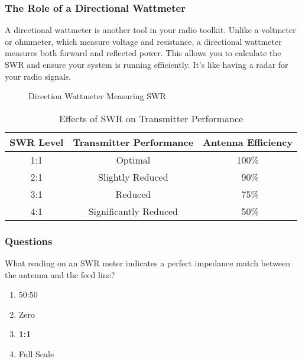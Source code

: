 \subsubsection*{The Role of a Directional Wattmeter}
A directional wattmeter is another tool in your radio toolkit. Unlike a voltmeter or ohmmeter, which measure voltage and resistance, a directional wattmeter measures both forward and reflected power. This allows you to calculate the SWR and ensure your system is running efficiently. It's like having a radar for your radio signals.


\begin{figure}[h]
    \centering
    \caption{Direction Wattmeter Measuring SWR}
    \label{fig:directional-wattmeter}
\end{figure}

\begin{table}[h]
    \centering
    \begin{tabular}{|c|c|c|}
        \hline
        \textbf{SWR Level} & \textbf{Transmitter Performance} & \textbf{Antenna Efficiency} \\
        \hline
        1:1 & Optimal & 100\% \\
        2:1 & Slightly Reduced & ~90\% \\
        3:1 & Reduced & ~75\% \\
        4:1 & Significantly Reduced & ~50\% \\
        \hline
    \end{tabular}
    \caption{Effects of SWR on Transmitter Performance}
    \label{tab:swr-effects}
\end{table}

\subsubsection{Questions}

\begin{tcolorbox}[colback=gray!10!white,colframe=black!75!black,title={T7C04}]
    What reading on an SWR meter indicates a perfect impedance match between the antenna and the feed line?
    \begin{enumerate}[label=\Alph*),noitemsep]
        \item 50:50
        \item Zero
        \item \textbf{1:1}
        \item Full Scale
    \end{enumerate}
\end{tcolorbox}

